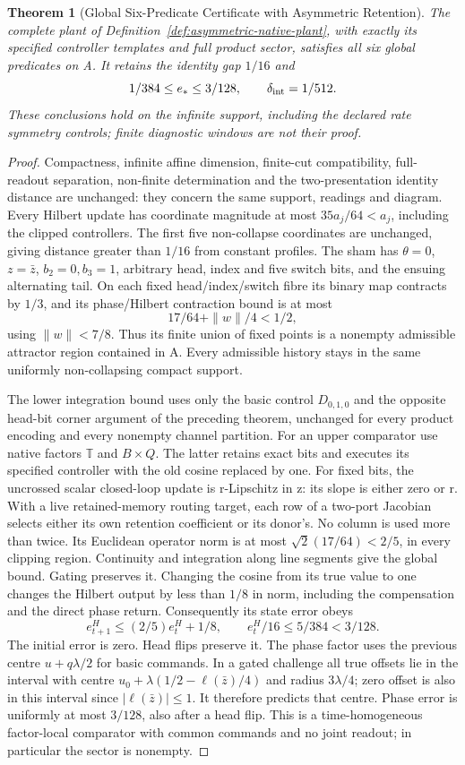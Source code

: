\documentclass[11pt,a4paper]{article}
\newtheorem{theorem}{Theorem}[section]
\theoremstyle{definition}
\begin{document}
\begin{theorem}[Global Six-Predicate Certificate with Asymmetric Retention]
\label{thm:asymmetric-native-six}
The complete plant of Definition~\ref{def:asymmetric-native-plant}, with
exactly its specified controller templates and full product sector, satisfies
all six global predicates on A. It retains the identity gap $1/16$ and
\[
 1/384\le e_*\le3/128,\qquad \delta_{\rm int}=1/512.
\]
These conclusions hold on the infinite support, including the declared rate
symmetry controls; finite diagnostic windows are not their proof.
\end{theorem}
\begin{proof}
Compactness, infinite affine dimension, finite-cut compatibility, full-readout
separation, non-finite determination and the two-presentation identity distance
are unchanged: they concern the same support, readings and diagram. Every
Hilbert update has coordinate magnitude at most $35a_j/64<a_j$, including
the clipped controllers. The first five non-collapse coordinates are unchanged,
giving distance greater than $1/16$ from constant profiles. The sham has
$\theta=0$, $z=\bar z$, $b_2=0,b_3=1$, arbitrary head, index and five switch bits,
and the ensuing alternating tail. On each fixed head/index/switch fibre its binary
map contracts by $1/3$, and its phase/Hilbert contraction bound is at most
\[
 17/64+\|w\|/4<1/2,
\]
using $\|w\|<7/8$. Thus its finite union of fixed points is a nonempty
admissible attractor region contained in A. Every admissible history stays
in the same uniformly non-collapsing compact support.

The lower integration bound uses only the basic control $D_{0,1,0}$ and
the opposite head-bit corner argument of the preceding theorem, unchanged
for every product encoding and every nonempty channel partition. For an
upper comparator use native factors $\mathbb T$ and $B\times Q$. The latter
retains exact bits and executes its specified controller with the old cosine
replaced by one. For fixed bits, the uncrossed scalar closed-loop update
is r-Lipschitz in z: its slope is either zero or r. With a live retained-memory
routing target, each row of a two-port Jacobian selects either its own
retention coefficient or its donor's. No column is used more than twice.
Its Euclidean operator norm is at most $\sqrt2(17/64)<2/5$, in every clipping
region. Continuity and integration along line segments give the global bound.
Gating preserves it. Changing the
cosine from its true value to one changes the Hilbert output by less than
$1/8$ in norm, including the compensation and the direct phase return.
Consequently its state error obeys
\[
 e_{t+1}^H\le(2/5)e_t^H+1/8,
 \qquad e_t^H/16\le5/384<3/128.
\]
The initial error is zero. Head flips preserve it. The phase factor uses
the previous centre $u+q\lambda/2$ for basic commands. In a gated challenge
all true offsets lie in the interval with centre
$u_0+\lambda(1/2-\ell(\bar z)/4)$ and radius $3\lambda/4$; zero offset is
also in this interval since $|\ell(\bar z)|\le1$. It therefore predicts
that centre. Phase error is uniformly at most $3/128$, also after a head
flip. This is a time-homogeneous factor-local comparator with common commands
and no joint readout; in particular the sector is nonempty.


\end{proof}
\end{document}
